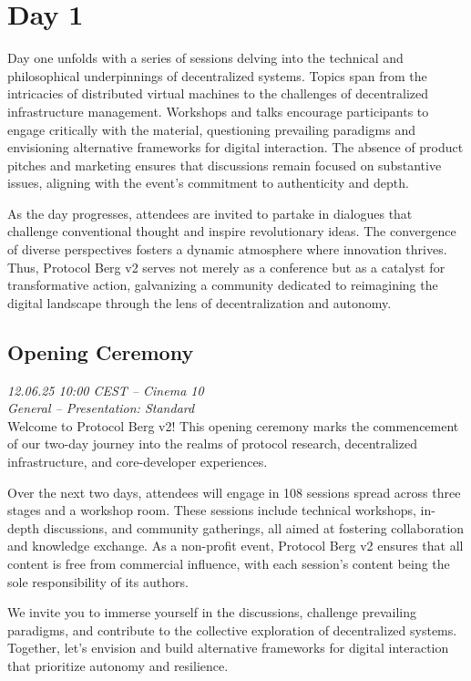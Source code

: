 
\section {Day 1} Day one unfolds with a series of sessions delving into the technical and philosophical underpinnings of decentralized systems. Topics span from the intricacies of distributed virtual machines to the challenges of decentralized infrastructure management. Workshops and talks encourage participants to engage critically with the material, questioning prevailing paradigms and envisioning alternative frameworks for digital interaction. The absence of product pitches and marketing ensures that discussions remain focused on substantive issues, aligning with the event's commitment to authenticity and depth.\par As the day progresses, attendees are invited to partake in dialogues that challenge conventional thought and inspire revolutionary ideas. The convergence of diverse perspectives fosters a dynamic atmosphere where innovation thrives. Thus, Protocol Berg v2 serves not merely as a conference but as a catalyst for transformative action, galvanizing a community dedicated to reimagining the digital landscape through the lens of decentralization and autonomy.\cleardoublepage
\subsection {Opening Ceremony} \noindent \textit {12.06.25 10:00 CEST -- Cinema 10\\ General -- Presentation: Standard}\\[1em] Welcome to Protocol Berg v2! This opening ceremony marks the commencement of our two-day journey into the realms of protocol research, decentralized infrastructure, and core-developer experiences.

Over the next two days, attendees will engage in 108 sessions spread across three stages and a workshop room. These sessions include technical workshops, in-depth discussions, and community gatherings, all aimed at fostering collaboration and knowledge exchange. As a non-profit event, Protocol Berg v2 ensures that all content is free from commercial influence, with each session's content being the sole responsibility of its authors.

We invite you to immerse yourself in the discussions, challenge prevailing paradigms, and contribute to the collective exploration of decentralized systems. Together, let's envision and build alternative frameworks for digital interaction that prioritize autonomy and resilience.

